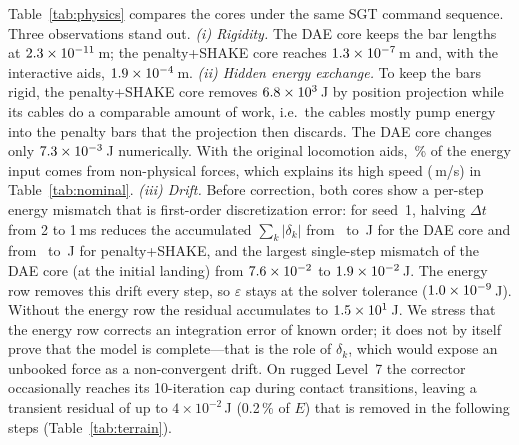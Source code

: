 Table~\ref{tab:physics} compares the cores
under the same SGT command sequence. Three observations stand out.
\emph{(i) Rigidity.} The DAE core keeps the bar lengths at
$2.3\times 10^{-11}$\,m; the penalty+SHAKE core reaches $1.3\times 10^{-7}$\,m and, with
the interactive aids, $1.9\times 10^{-4}$\,m.
\emph{(ii) Hidden energy exchange.} To keep the bars rigid, the
penalty+SHAKE core removes $6.8\times 10^{3}$\,J by position projection
while its cables do a comparable amount of work, i.e.\ the cables
mostly pump energy into the penalty bars that the projection then
discards. The DAE core changes only $7.3\times 10^{-3}$\,J numerically. With the
original locomotion aids, \pLegacyAidShare\,\% of the energy input comes
from non-physical forces, which explains its high speed
(\nLegSpeed\,m/s) in Table~\ref{tab:nominal}.
\emph{(iii) Drift.} Before correction, both cores show a per-step energy
mismatch that is first-order discretization error: for seed~1, halving
$\Delta t$ from 2 to 1\,ms reduces the accumulated $\sum_k|\delta_k|$
from \dcDaeTwoAbs\ to \dcDaeOneAbs\,J for the DAE core and from
\dcLegTwoAbs\ to \dcLegOneAbs\,J for penalty+SHAKE, and the largest
single-step mismatch of the DAE core (at the initial landing) from
$7.6\times 10^{-2}$ to $1.9\times 10^{-2}$\,J. The energy row removes this
drift every step, so $\varepsilon$ stays at the solver tolerance
($1.0\times 10^{-9}$\,J). Without the energy row the residual accumulates
to $1.5\times 10^{1}$\,J. We stress that the energy row corrects an
integration error of known order; it does not by itself prove that the
model is complete---that is the role of $\delta_k$, which would expose
an unbooked force as a non-convergent drift. On rugged Level~7 the
corrector occasionally reaches its 10-iteration cap during contact
transitions, leaving a transient residual of up to
$4\times10^{-2}$\,J (0.2\,\% of $E$) that is removed in the following
steps (Table~\ref{tab:terrain}).
